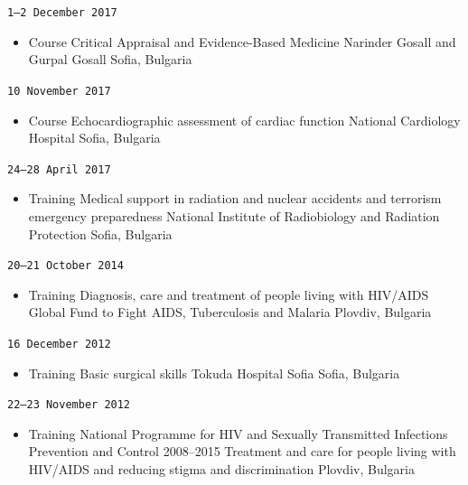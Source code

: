 \documentclass[
  10.5pt,
  a4paper,
  DIV=11,
  numbers=noendperiod]{scrartcl}
\providecommand{\tightlist}{%
  \setlength{\itemsep}{0pt}\setlength{\parskip}{0pt}}
\let\oldtexttt\texttt
\renewcommand{\texttt}[1]{{\color{cvbronze}\small\oldtexttt{#1}}}
\begin{document}
\texttt{1–2\ December\ 2017}

\begin{itemize}
\tightlist
\item
  Course \textbar{} Critical Appraisal and Evidence-Based Medicine
  \textbar{} Narinder Gosall and Gurpal Gosall \textbar{} Sofia,
  Bulgaria
\end{itemize}

\texttt{10\ November\ 2017}

\begin{itemize}
\tightlist
\item
  Course \textbar{} Echocardiographic assessment of cardiac function
  \textbar{} National Cardiology Hospital \textbar{} Sofia, Bulgaria
\end{itemize}

\texttt{24–28\ April\ 2017}

\begin{itemize}
\tightlist
\item
  Training \textbar{} Medical support in radiation and nuclear accidents
  and terrorism emergency preparedness \textbar{} National Institute of
  Radiobiology and Radiation Protection \textbar{} Sofia, Bulgaria
\end{itemize}

\texttt{20–21\ October\ 2014}

\begin{itemize}
\tightlist
\item
  Training \textbar{} Diagnosis, care and treatment of people living
  with HIV/AIDS \textbar{} Global Fund to Fight AIDS, Tuberculosis and
  Malaria \textbar{} Plovdiv, Bulgaria
\end{itemize}

\texttt{16\ December\ 2012}

\begin{itemize}
\tightlist
\item
  Training \textbar{} Basic surgical skills \textbar{} Tokuda Hospital
  Sofia \textbar{} Sofia, Bulgaria
\end{itemize}

\texttt{22–23\ November\ 2012}

\begin{itemize}
\tightlist
\item
  Training \textbar{} National Programme for HIV and Sexually
  Transmitted Infections Prevention and Control 2008--2015 \textbar{}
  Treatment and care for people living with HIV/AIDS and reducing stigma
  and discrimination \textbar{} Plovdiv, Bulgaria
\end{itemize}
\end{document}
